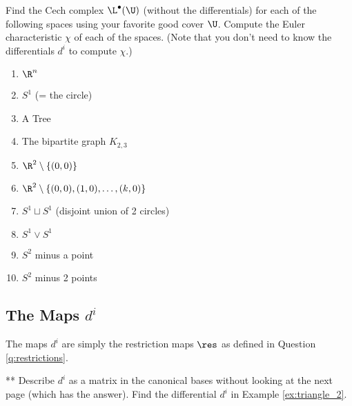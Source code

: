 \begin{ques}
	Find the Cech complex $\L^\bullet(\U)$ (without the differentials) for each of the following spaces using your favorite good cover $\U$. Compute the Euler characteristic $\chi$ of each of the spaces. (Note that you don't need to know the differentials $d^i$ to compute $\chi$.)
	\begin{multicols}{2}
		\begin{enumerate}
			\item $ \R^n$
			\item $ S^1$ (= the circle)
			\item A Tree
			\item The bipartite graph $ K_{2,3}$
			\item $ \R^2 \setminus \{(0,0) \}$
			\item $ \R^2 \setminus \{(0,0), (1,0), \dots, (k,0) \}$
			\item $S^1 \sqcup S^1$ (disjoint union of 2 circles)
			\item $S^1 \vee S^1$
			\item $ S^2 $ minus a point
			\item $ S^2 $ minus 2 points
		\end{enumerate}
	\end{multicols}
\end{ques}


\subsection{The Maps $d^i$}
The maps $d^i$ are simply the restriction maps $\res$ as defined in Question \ref{q:restrictions}.
\begin{ques}**
  Describe $d^i$ as a matrix in the canonical bases without looking at the next page (which has the answer). Find the differential $d^i$ in Example \ref{ex:triangle_2}.
\end{ques}
\newpage

